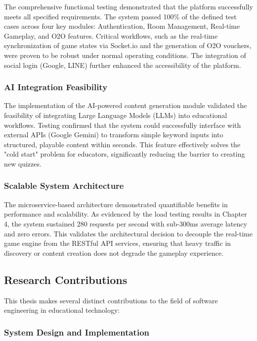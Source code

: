 The comprehensive functional testing demonstrated that the platform successfully meets all specified requirements. The system passed 100\% of the defined test cases across four key modules: Authentication, Room Management, Real-time Gameplay, and O2O features. Critical workflows, such as the real-time synchronization of game states via Socket.io and the generation of O2O vouchers, were proven to be robust under normal operating conditions. The integration of social login (Google, LINE) further enhanced the accessibility of the platform.

\subsubsection{AI Integration Feasibility}

The implementation of the AI-powered content generation module validated the feasibility of integrating Large Language Models (LLMs) into educational workflows. Testing confirmed that the system could successfully interface with external APIs (Google Gemini) to transform simple keyword inputs into structured, playable content within seconds. This feature effectively solves the "cold start" problem for educators, significantly reducing the barrier to creating new quizzes.

\subsubsection{Scalable System Architecture}

The microservice-based architecture demonstrated quantifiable benefits in performance and scalability. As evidenced by the load testing results in Chapter 4, the system sustained 280 requests per second with sub-300ms average latency and zero errors. This validates the architectural decision to decouple the real-time game engine from the RESTful API services, ensuring that heavy traffic in discovery or content creation does not degrade the gameplay experience.

\subsection{Research Contributions}

This thesis makes several distinct contributions to the field of software engineering in educational technology:

\subsubsection{System Design and Implementation}


